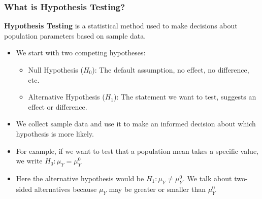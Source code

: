 \documentclass[notes,10pt, aspectratio=169]{beamer}
\begin{document}
\begin{frame}
    \frametitle{What is Hypothesis Testing?}
    
    \textbf{Hypothesis Testing} is a statistical method used to make decisions about population parameters based on sample data.
    
    \begin{itemize}
        \item We start with two competing hypotheses:
            \begin{itemize}
                \item Null Hypothesis ($H_0$): The default assumption, no effect, no difference, etc.
                \item Alternative Hypothesis ($H_1$): The statement we want to test, suggests an effect or difference.
            \end{itemize}
        \item We collect sample data and use it to make an informed decision about which hypothesis is more likely.
        \item For example, if we want to test that a population mean takes a specific value, we write $H_0: \mu_Y = \mu_Y^0$
        \item Here the alternative hypothesis would be $H_1: \mu_Y \neq \mu_Y^0$. We talk about two-sided alternatives because $ \mu_Y $ may be greater or smaller than $ \mu_Y^0$
    \end{itemize}
\end{frame}
\end{document}
